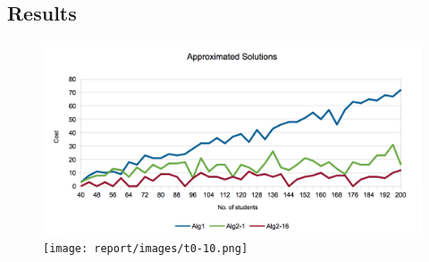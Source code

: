 \subsection{Results}
\label{sec:results}

\begin{figure}
	\begin{center}
		\includegraphics{report/images/t0-01.png}
		\texttt{[image: report/images/t0-10.png]}
	\end{center}
\end{figure}